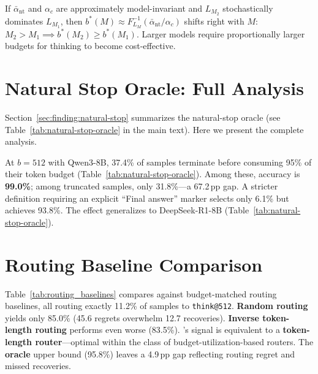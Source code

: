 \begin{corollary}
\label{cor:crossover-scaling-restated}
If $\bar{\alpha}_{\mathrm{nt}}$ and $\alpha_c$ are approximately
model-invariant and $L_{M_2}$ stochastically dominates $L_{M_1}$,
then $b^*(M) \approx F_{L_M}^{-1}(\bar{\alpha}_{\mathrm{nt}}/\alpha_c)$
shifts right with $M$:
$M_2 > M_1 \implies b^*(M_2) \ge b^*(M_1)$.
Larger models require proportionally larger budgets for thinking to
become cost-effective.
\end{corollary}

\section{Natural Stop Oracle: Full Analysis}
\label{app:natural-stop-details}

Section~\ref{sec:finding:natural-stop} summarizes the natural-stop oracle (see Table~\ref{tab:natural-stop-oracle} in the main text).
Here we present the complete analysis.

At $b{=}512$ with Qwen3-8B, 37.4\% of samples terminate before consuming
95\% of their token budget (Table~\ref{tab:natural-stop-oracle}).
Among these, accuracy is \textbf{99.0\%}; among truncated samples, only 31.8\%---a 67.2\,pp gap.
A stricter definition requiring an explicit ``Final answer'' marker selects only 6.1\% but achieves 93.8\%.
The effect generalizes to DeepSeek-R1-8B (Table~\ref{tab:natural-stop-oracle}).

\section{Routing Baseline Comparison}
\label{app:routing-baselines}

Table~\ref{tab:routing_baselines} compares \method{} against budget-matched routing baselines, all routing exactly 11.2\% of samples to \texttt{think@512}.
\textbf{Random routing} yields only 85.0\% (45.6 regrets overwhelm 12.7 recoveries).
\textbf{Inverse token-length routing} performs even worse (83.5\%).
\method{}'s signal is equivalent to a \textbf{token-length router}---optimal within the class of budget-utilization-based routers.
The \textbf{oracle} upper bound (95.8\%) leaves a 4.9\,pp gap reflecting routing regret and missed recoveries.

